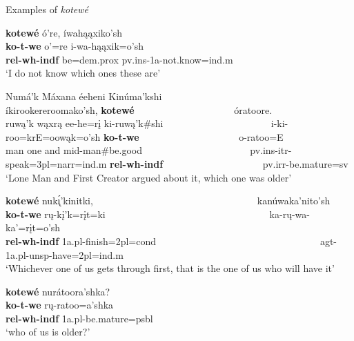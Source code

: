 \begin{exe}
\item\label{ExamplesOfKotewe} Examples of \textit{kotewé}

    \begin{xlist}
    \item\label{ExamplesOfKotewe1} \glll \textbf{kotewé} ó're, íwahąąxiko'sh\\
    \textbf{ko-t-we} o'=re i-wa-hąąxik=o'sh\\
    \textbf{rel-wh-indf} \textnormal{be}=dem.prox pv.ins-1a-\textnormal{not.know}=ind.m\\
    \glt `I do not know which ones these are' \citep[153]{hollow1973a}
    
    \item\label{ExamplesOfKotewe2} \glll Numá'k Máxana éeheni Kinúma'kshi ~ ~ ~ ~ ~ ~ ~ ~ ~ ~ ~ ~ ~   íkirookereroomako'sh, \textbf{kotewé} ~ ~ ~ ~ ~ ~ ~ ~ ~ ~ ~ ~ óratoore.\\
    ruwą'k wąxrą ee-he=rį ki-ruwą'k\#shi ~ ~ ~ ~ ~ ~ ~ ~ ~ ~ ~ ~ ~ i-ki-roo=krE=oowąk=o'sh \textbf{ko-t-we} ~ ~ ~ ~ ~ ~ ~ ~ ~ ~  ~ ~ o-ratoo=E\\
    \textnormal{man} \textnormal{one} \textnormal{and} mid-\textnormal{man}\#\textnormal{be.good} ~ ~ ~ ~ ~ ~ ~ ~ ~ ~ ~ ~ ~ pv.ins-itr-\textnormal{speak}=3pl=narr=ind.m \textbf{rel-wh-indf} ~ ~ ~ ~ ~ ~ ~ ~ ~ ~ ~ ~ pv.irr-\textnormal{be.mature}=sv\\
    \glt `Lone Man and First Creator argued about it, which one was older' \citep[1]{hollow1973a}
    
    \item\label{ExamplesOfKotewe3} \glll \textbf{kotewé} nuk\'{ı̨}'kinitki, ~ ~ ~ ~ ~ ~ ~ ~ ~ ~ ~ ~ ~ ~ ~ ~ ~ ~ ~ ~ kanúwaka'nito'sh\\
    \textbf{ko-t-we} rų-kį'k=rįt=ki ~ ~ ~ ~ ~ ~ ~ ~ ~ ~ ~ ~ ~ ~ ~ ~ ~ ~ ~ ~  ka-rų-wa-ka'=rįt=o'sh\\
    \textbf{rel-wh-indf} 1a.pl-\textnormal{finish}=2pl=cond ~ ~ ~ ~ ~ ~ ~ ~ ~ ~ ~ ~ ~ ~ ~ ~ ~ ~ ~ ~ agt-1a.pl-unsp-\textnormal{have}=2pl=ind.m\\
    \glt `Whichever one of us gets through first, that is the one of us who will have it' \citep[43]{hollow1973a}
    
    \item\label{ExamplesOfKotewe4} \glll \textbf{kotewé} nurátoora'shka?\\
    \textbf{ko-t-we} rų-ratoo=a'shka\\
    \textbf{rel-wh-indf} 1a.pl-\textnormal{be.mature}=psbl\\
    \glt `who of us is older?' \citep[6]{hollow1973a}
    

\end{xlist}
\end{exe}
